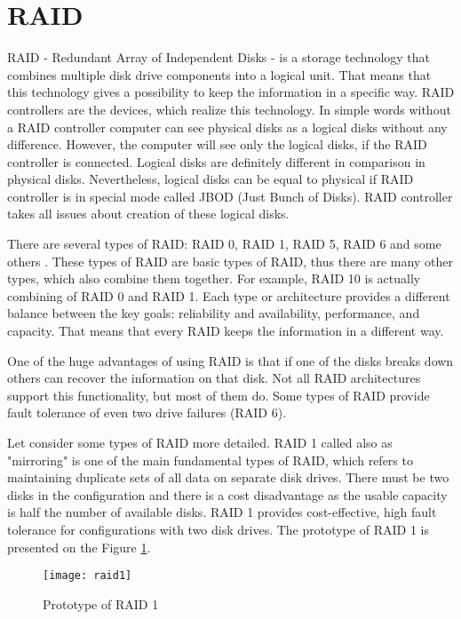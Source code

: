 \newpage
\section{RAID}
RAID - Redundant Array of Independent Disks - is a storage technology that combines multiple disk drive components into a logical unit. That means that this technology gives a possibility to keep the information in a specific way. RAID controllers are the devices, which realize this technology. In simple words without a RAID controller computer can see physical disks as a logical disks without any difference. However, the computer will see only the logical disks, if the RAID controller is connected. Logical disks are definitely different in comparison in physical disks. Nevertheless, logical disks can be equal to physical if RAID controller is in special mode called JBOD (Just Bunch of Disks). RAID controller takes all issues about creation of these logical disks.

There are several types of RAID: RAID 0, RAID 1, RAID 5, RAID 6 and some others \cite{which_raid}. These types of RAID are basic types of RAID, thus there are many other types, which also combine them together. For example, RAID 10 is actually combining of RAID 0 and RAID 1. Each type or architecture provides a different balance between the key goals: reliability and availability, performance, and capacity. That means that every RAID keeps the information in a different way. 

One of the huge advantages of using RAID is that if one of the disks breaks down others can recover the information on that disk. Not all RAID architectures support this functionality, but most of them do. Some types of RAID provide fault tolerance of even two drive failures (RAID 6).

Let consider some types of RAID more detailed. RAID 1 called also as "mirroring" is one of the main fundamental types of RAID, which refers to maintaining duplicate sets of all data on separate disk drives. There must be two disks in the configuration and there is a cost disadvantage as the usable capacity is half the number of available disks. RAID 1 provides cost-effective, high fault tolerance for configurations with two disk drives. The prototype of RAID 1 is presented on the Figure \ref{fig:raid1}.
\begin{figure}[h!]
\begin{center}
  \texttt{[image: raid1]}
\end{center}
  \caption{Prototype of RAID 1}
  \label{fig:raid1}
\end{figure}

